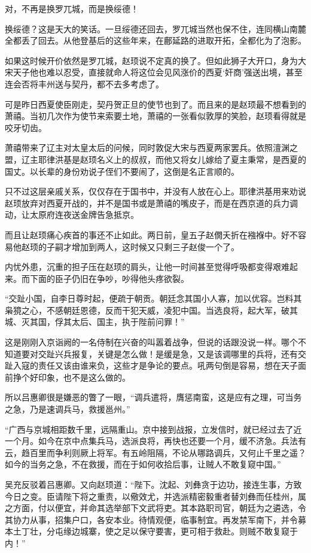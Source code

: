 对，不再是换罗兀城，而是换绥德！

换绥德？这是天大的笑话。一旦绥德还回去，罗兀城当然也保不住，连同横山南麓全都丢了回去。从他登基后的这些年来，在鄜延路的进取开拓，全都化为了泡影。

如果这时候开价依然是罗兀城，赵顼说不定真的换了。但如此狮子大开口，身为大宋天子他也难以忍受，直接就命人将这位会见风涨价的西夏‘奸商’强送出境，甚至连会否将丰州送与契丹，都不去多考虑了。

可是昨日西夏使臣刚走，契丹贺正旦的使节也到了。而且来的是赵顼最不想看到的萧禧。当初几次作为使节来索要土地，萧禧的一张看似敦厚的笑脸，赵顼看得就是咬牙切齿。

萧禧带来了辽主对太皇太后的问候，同时敦促大宋与西夏两家罢兵。依照澶渊之盟，辽主耶律洪基是赵顼名义上的叔叔，而他又将女儿嫁给了夏主秉常，是西夏的国丈。以长辈的身份劝说子侄们不要闹了，这倒是名正言顺的。

只不过这层亲戚关系，仅仅存在于国书中，并没有人放在心上。耶律洪基用来劝说赵顼放弃对西夏开战的，并不是国书或是萧禧的嘴皮子，而是在西京道的兵力调动，让太原府连夜送金牌告急抵京。

而且让赵顼痛心疾首的事还不止如此。两日前，皇五子赵僩夭折在襁褓中。好不容易他赵顼的子嗣才增加到两人，这时候又只剩三子赵俊一个了。

内忧外患，沉重的担子压在赵顼的肩头，让他一时间甚至觉得呼吸都变得艰难起来。而下面的臣子仍旧在争吵，吵得他头疼欲裂。

“交趾小国，自李日尊时起，便疏于朝贡。朝廷念其国小人寡，加以优容。岂料其枭獍之心，不感朝廷恩德，反而干犯天威，凌犯中国。当选良将，起大军，破其城、灭其国，俘其太后、国主，执于陛前问罪！”

这是刚刚入京诣阙的一名侍制在兴奋的叫嚣着战争，但说的话跟没说一样。哪个不知道要对交趾兴兵报复，关键是怎么做！是缓是急，又是该调哪里的兵将，还有交趾入寇的责任又该由谁来负，这些才是争论的要点。吼两句倒是容易，想在天子面前挣个好印象，也不是这么做的。

所以吕惠卿很是嫌恶的瞥了一眼，“调兵遣将，膺惩南蛮，这是应有之理，可当务之急，乃是速调兵马，救援邕州。”

“广西与京城相距数千里，远隔重山。京中接到战报，立发信时，就已经过去了近一个月。如今在京中点集兵马，选派良将，再快也还要一个月，缓不济急。兵法有云，趋百里而争利则厥上将军。有五岭阻隔，不论从哪路调兵，又何止千里之遥？如今的当务之急，不在救援，而在于如何收拾后事，让贼人不敢复窥中国。”

吴充反驳着吕惠卿。又向赵顼道：“陛下。沈起、刘彝贪于边功，接连生事，方致今日之变。臣请陛下将之重责，以儆效尤，并选派精密毅重者替刘彝而任桂州，属之方面，付以便宜，并命其选举部下文武将吏。其本路职司官，朝廷为之遴选，令其协力从事，招集户口，各安本业。待情观便，临事制宜。再发禁军南下，并令募本土丁壮，分屯缘边城寨，使之足以保守要害，更可相于救赴。则贼不敢复窥于内！”

